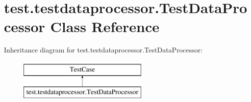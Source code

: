 \hypertarget{classtest_1_1testdataprocessor_1_1TestDataProcessor}{}\section{test.\+testdataprocessor.\+Test\+Data\+Processor Class Reference}
\label{classtest_1_1testdataprocessor_1_1TestDataProcessor}
Inheritance diagram for test.\+testdataprocessor.\+Test\+Data\+Processor\+:\begin{figure}[H]
\begin{center}
\leavevmode
\includegraphics[height=2.000000cm]{classtest_1_1testdataprocessor_1_1TestDataProcessor}
\end{center}
\end{figure}
